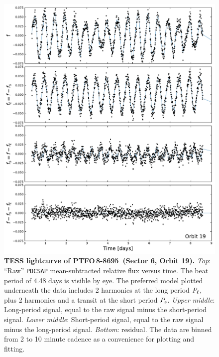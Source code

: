 \documentclass[12pt,twocolumn,tighten]{aastex62}
\newcommand{\ptfo}{PTFO$\,$8-8695}
\begin{document}
\begin{figure}[t!]
	\begin{center}
		\leavevmode
		\includegraphics[width=1\textwidth]{f1.pdf}
	\end{center}
	\vspace{-0.7cm}
	\caption{
		{\bf TESS lightcurve of \ptfo\ (Sector 6, Orbit 19).}
		{\it Top}: ``Raw'' \texttt{PDCSAP} mean-subtracted relative flux
		versus time. The beat period of 4.48 days is visible by eye.  The
		preferred model plotted underneath the data includes 2 harmonics at the long
		period $P_{\rm \ell}$, plus 2 harmonics and a transit at the short
		period $P_{\rm s}$.
		{\it Upper middle}: Long-period signal, equal to the raw signal
		minus the short-period signal.
		{\it Lower middle}: Short-period signal, equal to the raw signal
		minus the long-period signal.
		{\it Bottom}: residual.  The data are binned from 2 to 10 minute
		cadence as a convenience for plotting and fitting.
		\label{fig:splitsignal}
	}
\end{figure}
\end{document}
